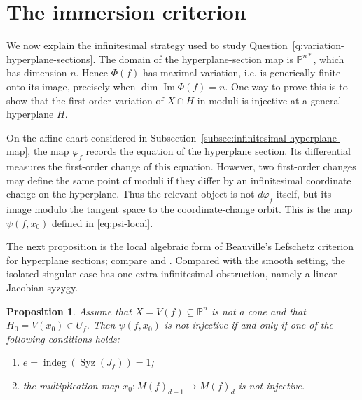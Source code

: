 \documentclass[11pt]{amsart}
\theoremstyle{plain}
\newtheorem{prop}[subsection]{Proposition}
\theoremstyle{definition}
\numberwithin{equation}{section}
\newcommand{\PP}{\mathbb{P}}
\begin{document}
\section{The immersion criterion}
\label{sec:immersion-criterion}

We now explain the infinitesimal strategy used to study Question~\ref{q:variation-hyperplane-sections}. The domain of the hyperplane-section map is $\PP^{n*}$, which has dimension $n$. Hence $\Phi(f)$
has maximal variation, i.e. is generically finite onto its image, precisely when $\dim\operatorname{Im}\Phi(f)=n$. One way to prove this is to show that the first-order variation of $X\cap H$ in moduli is injective at a general
hyperplane $H$.

On the affine chart considered in Subsection~\ref{subsec:infinitesimal-hyperplane-map},
the map $\varphi_f$ records the equation of the hyperplane section. Its differential measures the first-order change of this equation. However, two
first-order changes may define the same point of moduli if they differ by an infinitesimal coordinate change on the hyperplane. Thus the relevant object is
not $d\varphi_f$ itself, but its image modulo the tangent space to the coordinate-change orbit. This is the map $\psi(f,x_0)$ defined in \eqref{eq:psi-local}.


The next proposition is the local algebraic form of Beauville's Lefschetz
criterion for hyperplane sections; compare \cite[Proposition]{B} and
\cite[Proposition~2]{B2}. Compared with the smooth setting, the isolated
singular case has one extra infinitesimal obstruction, namely a linear Jacobian
syzygy.

\begin{prop}
\label{prop:local-criterion}
Assume that $X=V(f)\subseteq \PP^n$ is not a cone and that $H_0=V(x_0)\in U_f$. Then
$\psi(f,x_0)$ is not injective if and only if one of the following conditions
holds:
\begin{enumerate}
\item $e=\operatorname{indeg}(\operatorname{Syz}(J_f))=1$;
\item the multiplication map $x_0:M(f)_{d-1}\to M(f)_d$ is not injective.
\end{enumerate}
\end{prop}
\end{document}
